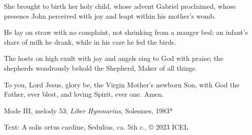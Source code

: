 \hymn



\begin{underhymnverse}
She brought to birth her holy child,
whose advent Gabriel proclaimed,
whose presence John perceived with joy
and leapt within his mother’s womb.

He lay on straw with no complaint,
not shrinking from a manger bed;
an infant’s share of milk he drank,
while in his care he fed the birds.

The hosts on high exult with joy
and angels sing to God with praise;
the shepherds wondrously behold
the Shepherd, Maker of all things.

To you, Lord Jesus, glory be,
the Virgin Mother’s newborn Son,
with God the Father, ever blest,
and loving Spirit, ever one. Amen.
\end{underhymnverse}

\begin{hymnsource}
Mode III, melody 53; \emph{Liber Hymnarius,} Solesmes, 1983*

Text: {A solis ortus cardine,} Sedulius, ca. 5th c., © 2023 ICEL
\end{hymnsource}

